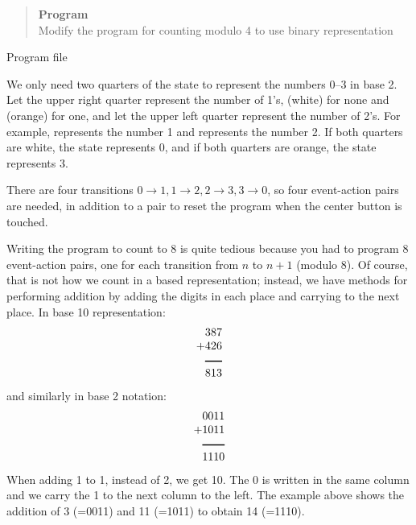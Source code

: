 \newpage

\begin{quote}
\textbf{Program}\\
Modify the program for counting modulo 4 to use binary representation
\end{quote}

{\raggedleft \hfill Program file }

We only need two quarters of the state to represent the numbers
0--3 in base 2.
Let the upper right quarter represent the number of 1's,
 (white) for none and  (orange) for one,
and let the upper left quarter represent the number of 2's.
For example,  represents the number 1 and
 represents the number 2.
If both quarters are white, the state represents 0, and if both
quarters are orange, the state represents 3.

There are four transitions $0\rightarrow 1, 1\rightarrow 2, 2
\rightarrow 3, 3\rightarrow 0$, so four event-action pairs
are needed, in addition to a pair to reset the program
when the center button is touched.

\medskip


\medskip




Writing the program to count to 8 is quite tedious because you had to
program 8 event-action pairs, one for each transition from $n$ to $n+1$
(modulo 8). Of course, that is not how we count in a based
representation;
instead, we have methods for performing addition by adding the digits
in each place and carrying to the next place. In base 10
representation:
\begin{displaymath}
\begin{array}{r}
387\\
+426\\
\rule[1pt]{1.5em}{1pt}\\
813\\
\end{array}
\end{displaymath}
and similarly in base 2 notation:
\begin{displaymath}
\begin{array}{r}
0011\\
+1011\\
\rule[1pt]{2em}{1pt}\\
1110\\
\end{array}
\end{displaymath}
When adding 1 to 1, instead of 2, we get 10.
The 0 is written in the same column and we carry the 1 to the next
column to the left.
The example above shows the addition of 3 (=0011) and 11 (=1011)
to obtain 14 (=1110).

